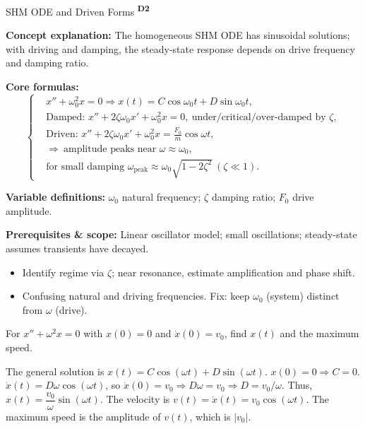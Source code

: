 ﻿\documentclass[12pt,a4paper]{article}
\providecommand{\KPFormulas}{}
\providecommand{\KPHeuristics}{}
\providecommand{\KPProblems}{}
\newcommand{\DTwo}{\texorpdfstring{\textsuperscript{\textbf{D2}}}{ D2}}
\begin{document}
\begin{KnowledgePoint}{SHM ODE and Driven Forms \DTwo}
  \KPFormulas
  \begin{formulabox}
  \textbf{Concept explanation:} The homogeneous SHM ODE has sinusoidal solutions; with driving and damping, the steady-state response depends on drive frequency and damping ratio.

  \textbf{Core formulas:}
  \[
  \left\{\begin{aligned}
    &x''+\omega_0^2 x=0 \Rightarrow x(t)=C\cos\omega_0 t+D\sin\omega_0 t,\\
    &\text{Damped: } x''+2\zeta\omega_0 x'+\omega_0^2 x=0,\ \text{under/critical/over-damped by }\zeta,\\
      &\text{Driven: } x''+2\zeta\omega_0 x'+\omega_0^2 x=\frac{F_0}{m}\cos\omega t,\\
      &\Rightarrow\ \text{amplitude peaks near }\omega\approx\omega_0,\\
      &\text{for small damping }\omega_{\text{peak}}\approx\omega_0\sqrt{1-2\zeta^2}\ (\zeta\ll1).
  \end{aligned}\right.
  \]

  \textbf{Variable definitions:} $\omega_0$ natural frequency; $\zeta$ damping ratio; $F_0$ drive amplitude.

  \textbf{Prerequisites \& scope:} Linear oscillator model; small oscillations; steady-state assumes transients have decayed.
  \end{formulabox}

  \KPHeuristics
  \begin{heuristicsbox}
  \begin{itemize}[leftmargin=*]
    \item Identify regime via $\zeta$; near resonance, estimate amplification and phase shift.
  \end{itemize}
  \vspace{0.4em}
  \begin{itemize}[leftmargin=*]
    \item Confusing natural and driving frequencies. Fix: keep $\omega_0$ (system) distinct from $\omega$ (drive).
  \end{itemize}
  \end{heuristicsbox}

  \KPProblems
\begin{cheatproblem}
  For $x''+\omega^2x=0$ with $x(0)=0$ and $\dot x(0)=v_0$, find $x(t)$ and the maximum speed.
  \begin{solutionbox}
  The general solution is $x(t)=C\cos(\omega t)+D\sin(\omega t)$.
  $x(0)=0 \Rightarrow C=0$.
  $\dot x(t) = D\omega\cos(\omega t)$, so $\dot x(0)=v_0 \Rightarrow D\omega=v_0 \Rightarrow D=v_0/\omega$.
  Thus, $x(t)=\dfrac{v_0}{\omega}\sin(\omega t)$. The velocity is $v(t) = \dot x(t) = v_0\cos(\omega t)$.
  The maximum speed is the amplitude of $v(t)$, which is $|v_0|$.
  \end{solutionbox}
  \end{cheatproblem}
\end{KnowledgePoint}
\end{document}
